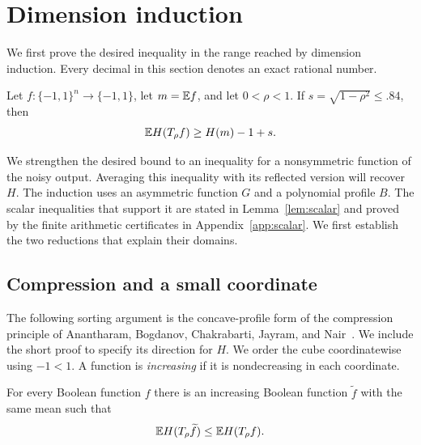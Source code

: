 \section{Dimension induction}
\label{sec:induction}

We first prove the desired inequality in the range reached by dimension
induction.  Every decimal in this section denotes an exact rational number.

\begin{theorem}\label{thm:induction}
Let $f:\{-1,1\}^n\to\{-1,1\}$, let $m=\mathbb E f$, and let
$0<\rho<1$.  If $s=\sqrt{1-\rho^2}\le .84$, then
\[
  \mathbb E H(T_\rho f)\ge H(m)-1+s.
\]
\end{theorem}

We strengthen the desired bound to an inequality for a nonsymmetric
function of the noisy output.  Averaging this inequality with its
reflected version will recover $H$.
The induction uses an asymmetric function $G$ and a polynomial profile $B$.
The scalar inequalities that support it are stated in Lemma~\ref{lem:scalar}
and proved by the finite arithmetic certificates in Appendix~\ref{app:scalar}.
We first establish the two reductions that explain their domains.

\subsection{Compression and a small coordinate}

The following sorting argument is the concave-profile form of the
compression principle of Anantharam, Bogdanov, Chakrabarti, Jayram, and
Nair~\cite[Proposition~2]{ABCJN}. We include the short proof to specify
its direction for $H$.
We order the cube coordinatewise using $-1<1$. A function is
\emph{increasing} if it is nondecreasing in each coordinate.

\begin{lemma}[Compression]\label{ind:lem:compression}
For every Boolean function $f$ there is an increasing Boolean function
$\widetilde f$ with the same mean such that
\[
  \mathbb E H(T_\rho\widetilde f)\le \mathbb E H(T_\rho f).
\]
\end{lemma}

